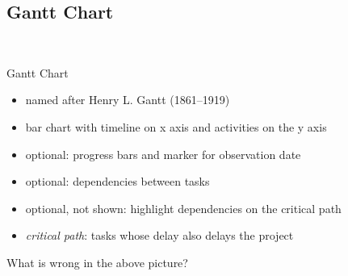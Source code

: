 
\subsection{Gantt Chart}
\begin{frame}{\insertsubsection\ \mytitlesource{\ludewiglichter, \sommerville}}
	\begin{fancycolumns}[widths={40,58}]
		\begin{definition}{Gantt Chart}
			\begin{itemize}
				\item named after Henry L. Gantt (1861--1919)
				\item bar chart with timeline on x axis and activities on the y axis
				\item optional: progress bars and marker for observation date
				\item optional: dependencies between tasks
				\item optional, not shown: highlight dependencies on the critical path
				\item \emph{critical path}: tasks whose delay also delays the project
			\end{itemize}
		\end{definition}
		\nextcolumn
		\begin{exampletight}{}
		\end{exampletight}
		\pause[3]
		\begin{example}{}\centering
			What is wrong in the above picture?
		\end{example}
	\end{fancycolumns}
\end{frame}

\newcommand{\forwardpass}[1]{#1}
\newcommand{\backwardpass}[1]{#1}
\newcommand{\buffer}[1]{#1}
\newcommand{\networknode}[7]{
	\begin{tikzpicture}[every node/.style={draw=black,anchor=base,minimum height=5mm,text width=7.5mm,align=center},inner xsep=0mm,line width=.5pt,node distance=-.5pt]
		\node[text width=22.5mm] (task) {#1};
		\node (d) [above=of task] {#3};
		\node (es) [left=of d] {\forwardpass{#2}};
		\node (ef) [right=of d] {\forwardpass{#4}};
		\node (b) [below=of task] {\buffer{#6}};
		\node (ls) [left=of b] {\backwardpass{#5}};
		\node (lf) [right=of b] {\backwardpass{#7}};
	\end{tikzpicture}
}

